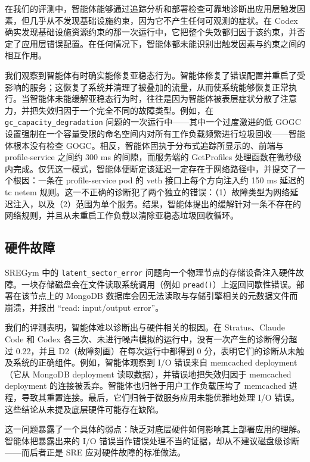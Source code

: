 \documentclass[11pt,UTF8,fontset=fandol]{ctexart}
\begin{document}
在我们的评测中，智能体能够通过追踪分析和部署检查可靠地诊断出应用层触发因素，但几乎从不发现基础设施约束，因为它不产生任何可观测的症状。在 Codex 确实发现基础设施资源约束的那一次运行中，它把整个失效都归因于该约束，并否定了应用层错误配置。在任何情况下，智能体都未能识别出触发因素与约束之间的相互作用。

我们观察到智能体有时确实能修复亚稳态行为。智能体修复了错误配置并重启了受影响的服务；这恢复了系统并清理了被叠加的流量，从而使系统能够恢复正常执行。当智能体未能缓解亚稳态行为时，往往是因为智能体被表层症状分散了注意力，并把失效归因于一个完全不同的故障类型。例如，在 \texttt{gc\_capacity\_degradation} 问题的一次运行中——其中一个过度激进的低 GOGC 设置强制在一个容量受限的命名空间内对所有工作负载频繁进行垃圾回收——智能体根本没有检查 GOGC。相反，智能体固执于分布式追踪所显示的、前端与 profile-service 之间约 300 ms 的间隙，而服务端的 GetProfiles 处理函数在微秒级内完成。仅凭这一模式，智能体便断定该延迟一定存在于网络路径中，并提交了一个根因：一条在 profile-service pod 的 veth 接口上每个方向注入约 150 ms 延迟的 tc netem 规则。这一不正确的诊断犯了两个独立的错误：（1）故障类型为网络延迟注入，以及（2）范围为单个服务。结果，智能体提出的缓解针对一条不存在的网络规则，并且从未重启工作负载以清除亚稳态垃圾回收循环。

\subsection{硬件故障}

SREGym 中的 \texttt{latent\_sector\_error} 问题向一个物理节点的存储设备注入硬件故障。一块存储磁盘会在文件读取系统调用（例如 \texttt{pread()}）上返回间歇性错误。部署在该节点上的 MongoDB 数据库会因无法读取与存储引擎相关的元数据文件而崩溃，并报出 “read: input/output error”。

我们的评测表明，智能体难以诊断出与硬件相关的根因。在 Stratus、Claude Code 和 Codex 各三次、未进行噪声模拟的运行中，没有一次产生的诊断得分超过 0.22，并且 D2（故障刻画）在每次运行中都得到 0 分，表明它们的诊断从未触及系统的正确组件。例如，智能体观察到 I/O 错误来自 memcached deployment（它从 MongoDB deployment 读取数据），并错误地把失效归因于 memcached deployment 的连接被丢弃。智能体也归咎于用户工作负载压垮了 memcached 进程，导致其重置连接。最后，它们归咎于微服务应用未能优雅地处理 I/O 错误。这些结论从未提及底层硬件可能存在缺陷。

这一问题暴露了一个具体的弱点：缺乏对底层硬件如何影响其上部署应用的理解。智能体把暴露出来的 I/O 错误当作错误处理不当的证据，却从不建议磁盘级诊断——而后者正是 SRE 应对硬件故障的标准做法。
\end{document}
